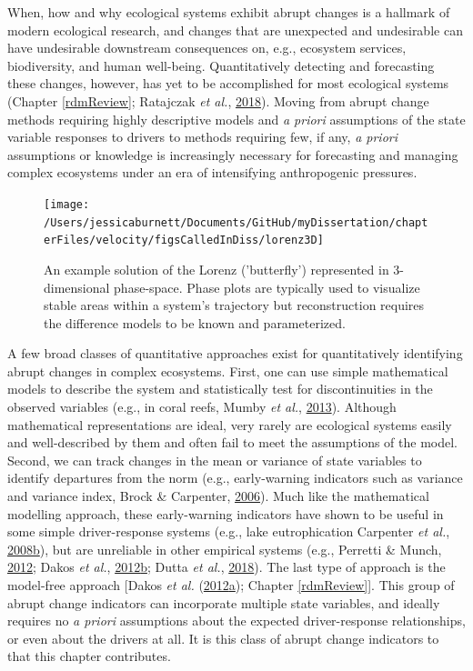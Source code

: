 \documentclass[12pt,twoside,openany]{reedthesis}
\begin{document}
When, how and why ecological systems exhibit abrupt changes is a hallmark of modern ecological research, and changes that are unexpected and undesirable can have undesirable downstream consequences on, e.g., ecosystem services, biodiversity, and human well-being. Quantitatively detecting and forecasting these changes, however, has yet to be accomplished for most ecological systems (Chapter \ref{rdmReview}; Ratajczak \emph{et al.}, \protect\hyperlink{ref-ratajczak2018abrupt}{2018}). Moving from abrupt change methods requiring highly descriptive models and \emph{a priori} assumptions of the state variable responses to drivers to methods requiring few, if any, \emph{a priori} assumptions or knowledge is increasingly necessary for forecasting and managing complex ecosystems under an era of intensifying anthropogenic pressures.
\begin{figure}[bth]

{\centering \texttt{[image: /Users/jessicaburnett/Documents/GitHub/myDissertation/chapterFiles/velocity/figsCalledInDiss/lorenz3D]} 

}

\caption{An example solution of the Lorenz ('butterfly') represented in 3-dimensional phase-space. Phase plots are typically used to visualize stable areas within a system's trajectory but reconstruction requires the difference models to be known and parameterized.}\label{fig:lorenz3D}
\end{figure}
A few broad classes of quantitative approaches exist for quantitatively identifying abrupt changes in complex ecosystems. First, one can use simple mathematical models to describe the system and statistically test for discontinuities in the observed variables (e.g., in coral reefs, Mumby \emph{et al.}, \protect\hyperlink{ref-mumby2013evidence}{2013}). Although mathematical representations are ideal, very rarely are ecological systems easily and well-described by them and often fail to meet the assumptions of the model. Second, we can track changes in the mean or variance of state variables to identify departures from the norm (e.g., early-warning indicators such as variance and variance index, Brock \& Carpenter, \protect\hyperlink{ref-brock_variance_2006}{2006}). Much like the mathematical modelling approach, these early-warning indicators have shown to be useful in some simple driver-response systems (e.g., lake eutrophication Carpenter \emph{et al.}, \protect\hyperlink{ref-carpenter_leading_2008}{2008}\protect\hyperlink{ref-carpenter_leading_2008}{b}), but are unreliable in other empirical systems (e.g., Perretti \& Munch, \protect\hyperlink{ref-perretti2012regime}{2012}; Dakos \emph{et al.}, \protect\hyperlink{ref-dakos2012robustness}{2012}\protect\hyperlink{ref-dakos2012robustness}{b}; Dutta \emph{et al.}, \protect\hyperlink{ref-dutta2018robustness}{2018}). The last type of approach is the model-free approach {[}Dakos \emph{et al.} (\protect\hyperlink{ref-dakos2012methods}{2012}\protect\hyperlink{ref-dakos2012methods}{a}); Chapter \ref{rdmReview}{]}. This group of abrupt change indicators can incorporate multiple state variables, and ideally requires no \emph{a priori} assumptions about the expected driver-response relationships, or even about the drivers at all. It is this class of abrupt change indicators to that this chapter contributes.
\end{document}
